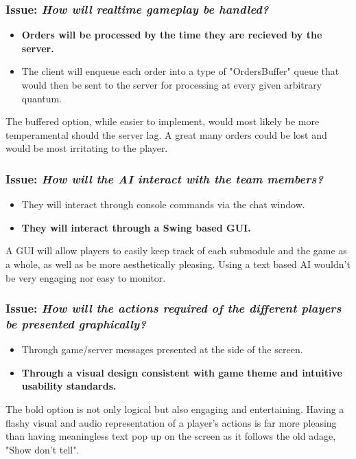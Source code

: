 \subsubsection*{Issue: \textit{How will realtime gameplay be handled?}}

  \begin{itemize}
    \item \textbf{Orders will be processed by the time they are recieved by the server.}
    \item The client will enqueue each order into a type of "OrdersBuffer" queue that would then be sent to the server for processing at every given arbitrary quantum.
  \end{itemize}

The buffered option, while easier to implement, would most likely be more temperamental should the server lag. A great many orders could be lost and would be most irritating to the player.

\subsubsection*{Issue: \textit{How will the AI interact with the team members?}}

  \begin{itemize}
    \item They will interact through console commands via the chat window.
    \item \textbf{They will interact through a Swing based GUI.}
  \end{itemize}

A GUI will allow players to easily keep track of each submodule and the game as a whole, as well as be more aesthetically pleasing. Using a text based AI wouldn't be very engaging nor easy to monitor.

\subsubsection*{Issue: \textit{How will the actions required of the different players be presented graphically?}}

  \begin{itemize}
    \item Through game/server messages presented at the side of the screen.
    \item \textbf{Through a visual design consistent with game theme and intuitive usability standards.}
  \end{itemize}

The bold option is not only logical but also engaging and entertaining. Having a flashy visual and audio representation of a player's actions is far more pleasing than having meaningless text pop up on the screen as it follows the old adage, "Show don't tell".
